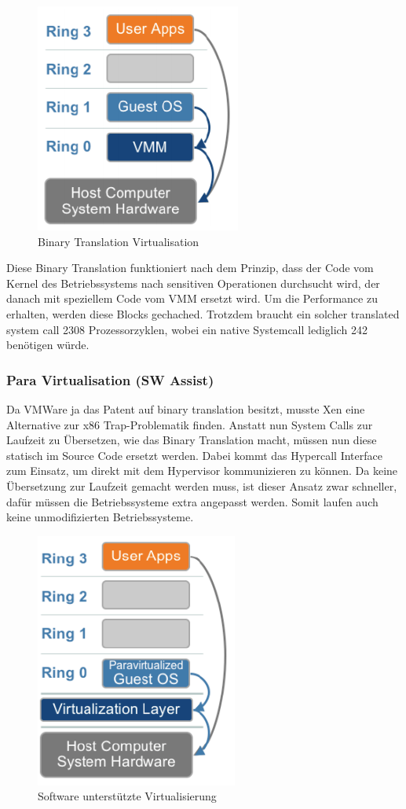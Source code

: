 \begin{figure}[h!]
	\centering
	\includegraphics[width=0.3\linewidth]{fig/binary-translation-virt}
	\caption{Binary Translation Virtualisation}
	\label{fig:binary-translation-virt}
\end{figure}

Diese Binary Translation funktioniert nach dem Prinzip, dass der Code vom Kernel des Betriebssystems nach sensitiven Operationen durchsucht wird, der danach mit speziellem Code vom VMM ersetzt wird. Um die Performance zu erhalten, werden diese Blocks gechached. Trotzdem braucht ein solcher translated system call 2308 Prozessorzyklen, wobei ein native Systemcall lediglich 242 benötigen würde.

\subsubsection{Para Virtualisation (SW Assist)}
Da VMWare ja das Patent auf binary translation besitzt, musste Xen eine Alternative zur x86 Trap-Problematik finden. Anstatt nun System Calls zur Laufzeit zu Übersetzen, wie das Binary Translation macht, müssen nun diese statisch im Source Code ersetzt werden. Dabei kommt das Hypercall Interface zum Einsatz, um direkt mit dem Hypervisor kommunizieren zu können. Da keine Übersetzung zur Laufzeit gemacht werden muss, ist dieser Ansatz zwar schneller, dafür müssen die Betriebssysteme extra angepasst werden. Somit laufen auch keine unmodifizierten Betriebssysteme.
\begin{figure}[h!]
\centering
\includegraphics[width=0.2\linewidth]{fig/sw-virtualisierung-ringe}
\caption{Software unterstützte Virtualisierung}
\label{fig:sw-virtualisierung-ringe}
\end{figure}

